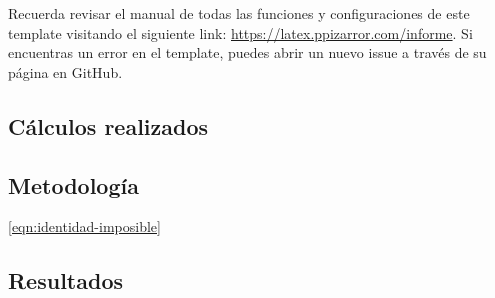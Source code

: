 	Recuerda revisar el manual de todas las funciones y configuraciones de este template visitando el siguiente link: \url{https://latex.ppizarror.com/informe}. Si encuentras un error en el template, puedes abrir un nuevo issue a través de su página en GitHub.


\clearpage



\begin{appendixd}

	\section{Cálculos realizados}

	\subsection{Metodología}

	\lipsum[1-2] \eqref{eqn:identidad-imposible}


	\subsection{Resultados}

	\lipsum[10]


\end{appendixd}

